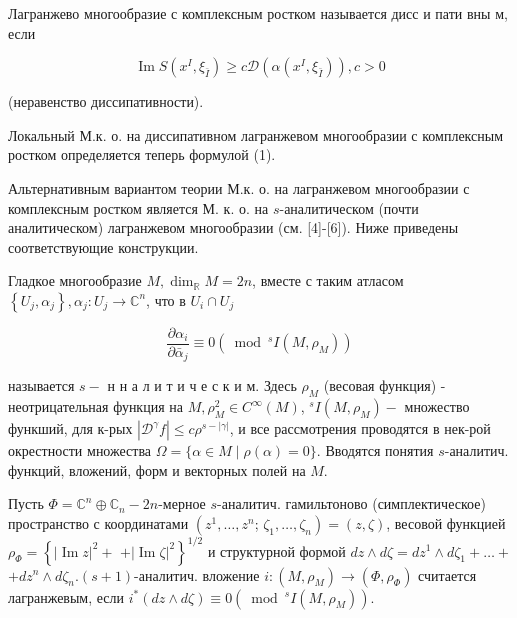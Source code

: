 \documentclass[10pt]{article}
\begin{document}
Лагранжево многообразие с комплексным ростком называется дисс и пати вны м, если



\[

\operatorname{Im} S\left(x^{I}, \xi_{\bar{I}}\right) \geqslant c \mathscr{D}\left(\alpha\left(x^{I}, \xi_{\bar{I}}\right)\right), c>0

\]



(неравенство диссипативности).



Локальный М.к. о. на диссипативном лагранжевом многообразии с комплексным ростком определяется теперь формулой (1).



Альтернативным вариантом теории М.к. о. на лагранжевом многообразии с комплексным ростком является М. к. о. на $s$-аналитическом (почти аналитическом) лагранжевом многообразии (см. [4]-[6]). Ниже приведены соответствующие конструкции.



Гладкое многообразие $M, \operatorname{dim}_{\mathbb{R}} M=2 n$, вместе с таким атласом $\left\{U_{j}, \alpha_{j}\right\}, \alpha_{j}: U_{j} \rightarrow \mathbb{C}^{n}$, что в $U_{i} \cap U_{j}$



\[

\frac{\partial \alpha_{i}}{\partial \bar{\alpha}_{j}} \equiv 0\left(\bmod ^{s} I\left(M, \rho_{M}\right)\right)

\]



называется $s-$ н н а л и т и ч е с к и м. Здесь $\rho_{M}$ (весовая функция) - неотрицательная функция на $M, \rho_{M}^{2} \in C^{\infty}(M)$, ${ }^{s} I\left(M, \rho_{M}\right)-$ множество функший, для к-рых $\left|\mathscr{D}^{\gamma} f\right| \leqslant c \rho^{s-|\gamma|}$, и все рассмотрения проводятся в нек-рой окрестности множества $\Omega=\{\alpha \in M \mid \rho(\alpha)=0\}$. Вводятся понятия $s$-аналитич. функций, вложений, форм и векторных полей на $M$.



Пусть $\Phi=\mathbb{C}^{n} \oplus \mathbb{C}_{n}-2 n$-мерное $s$-аналитич. гамильтоново (симплектическое) пространство с координатами $\left(z^{1}, \ldots, z^{n}\right.$; $\left.\zeta_{1}, \ldots, \zeta_{n}\right)=(z, \zeta)$, весовой функцией $\rho_{\Phi}=\left\{|\operatorname{Im} z|^{2}+\right.$ $\left.+|\operatorname{Im} \zeta|^{2}\right\}^{1 / 2}$ и структурной формой $d z \wedge d \zeta=d z^{1} \wedge d \zeta_{1}+\ldots+$ $+d z^{n} \wedge d \zeta_{n} .(s+1)$-аналитич. вложение $i:\left(M, \rho_{M}\right) \rightarrow\left(\Phi, \rho_{\Phi}\right)$ считается лагранжевым, если $i^{*}(d z \wedge d \zeta) \equiv 0\left(\bmod ^{s} I\left(M, \rho_{M}\right)\right)$.
\end{document}

